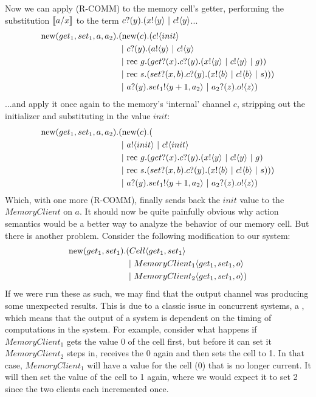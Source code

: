 Now we can apply (R-COMM) to the memory cell's getter, performing the substitution $\llbracket{a}/{x}\rrbracket$ to the term ${c}?({y}).({x}!\langle{y}\rangle\ |\  {c}!\langle{y}\rangle$...
\begin{equation}\begin{split}
	\text{new}({get_1, set_1,a,a_2}).&(\text{new}({c}). ({c}!\langle{init}\rangle \\
		&\ |\  {c}?({y}).({a}!\langle{y}\rangle\ |\  {c}!\langle{y}\rangle \\
		&\ |\ \text{rec }{g}.({get}?({x}).{c}?({y}).({x}!\langle{y}\rangle\ |\  {c}!\langle{y}\rangle\ |\  g))\\
		&\ |\ \text{rec }{s}.({set}?({x,b}).{c}?({y}).({x}!\langle{b}\rangle\ |\ {c}!\langle{b}\rangle\ |\  s)))\\
		&\ |\  {a}?({y}). {set_1}!\langle{y+1,a_2}\rangle \ |\  {a_2}?({z}).{o}!\langle{z}\rangle)
\end{split}\end{equation}
...and apply it once again to the memory's `internal' channel $c$, stripping out the initializer and substituting in the value $init$:
\begin{equation}\begin{split}
	\text{new}({get_1, set_1,a,a_2}).&(\text{new}({c}). (\\
		&\ |\  {a}!\langle{init}\rangle\ |\  {c}!\langle{init}\rangle \\
		&\ |\ \text{rec }{g}.({get}?({x}).{c}?({y}).({x}!\langle{y}\rangle\ |\  {c}!\langle{y}\rangle\ |\  g)\\
		&\ |\ \text{rec }{s}.({set}?({x,b}).{c}?({y}).({x}!\langle{b}\rangle\ |\ {c}!\langle{b}\rangle\ |\  s)))\\
		&\ |\  {a}?({y}). {set_1}!\langle{y+1,a_2}\rangle \ |\  {a_2}?({z}).{o}!\langle{z}\rangle)
\end{split}\end{equation}
Which, with one more (R-COMM), finally sends back the $init$ value to the $MemoryClient$ on $a$.  
It should now be quite painfully obvious why action semantics would be a better way to analyze the behavior of our memory cell.  
But there is another problem.  
Consider the following modification to our system:
\begin{equation}\begin{split}
	\text{new}({get_1,set_1}).&(Cell\langle get_1, set_1\rangle\\
	 &\ |\   MemoryClient_1\langle get_1,set_1,o\rangle \\
	 &\ |\   MemoryClient_2\langle get_1,set_1,o\rangle)
\end{split}\end{equation}
If we were run these as such, we may find that the output channel was producing some unexpected results.  
This is due to a classic issue in concurrent systems, a , which means that the output of a system is dependent on the timing of computations in the system.  
For example, consider what happens if $MemoryClient_1$ gets the value 0 of the cell first, but before it can set it $MemoryClient_2$ steps in, receives the 0 again and then sets the cell to 1.  
In that case, $MemoryClient_1$ will have a value for the cell (0) that is no longer current.  
It will then set the value of the cell to 1 again, where we would expect it to set 2 since the two clients each incremented once.

